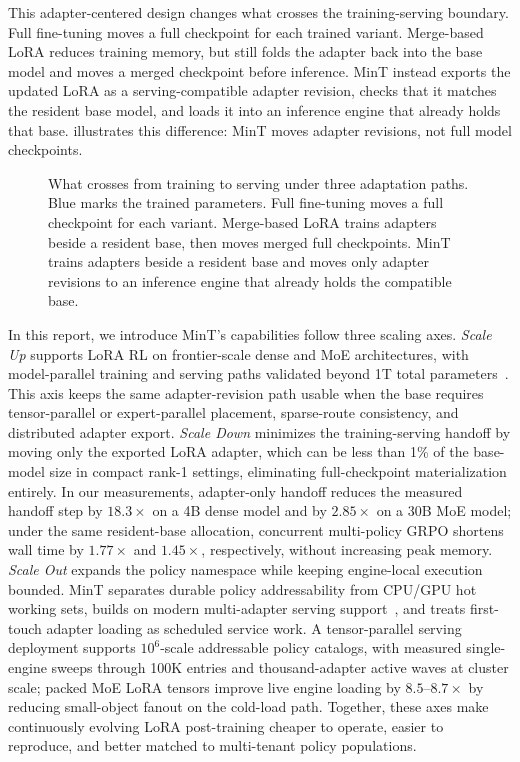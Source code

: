 This adapter-centered design changes what crosses the training-serving boundary. Full fine-tuning moves a full checkpoint for each trained variant. Merge-based LoRA reduces training memory, but still folds the adapter back into the base model and moves a merged checkpoint before inference. MinT instead exports the updated LoRA as a serving-compatible adapter revision, checks that it matches the resident base model, and loads it into an inference engine that already holds that base.  illustrates this difference: MinT moves adapter revisions, not full model checkpoints.

\begin{figure}[H]
    \centering
    \resizebox{\textwidth}{!}{}
    \caption{What crosses from training to serving under three adaptation paths. Blue marks the trained parameters. Full fine-tuning moves a full checkpoint for each variant. Merge-based LoRA trains adapters beside a resident base, then moves merged full checkpoints. MinT trains adapters beside a resident base and moves only adapter revisions to an inference engine that already holds the compatible base.}
    \label{fig:mint_handoff_paths}
\end{figure}

In this report, we introduce MinT's capabilities follow three scaling axes. \textit{Scale Up} supports LoRA RL on frontier-scale dense and MoE architectures, with model-parallel training and serving paths validated beyond 1T total parameters~\citep{qwen3_2025,deepseekv4_2026,glm5_2026,kimi_k2_2025}. This axis keeps the same adapter-revision path usable when the base requires tensor-parallel or expert-parallel placement, sparse-route consistency, and distributed adapter export. \textit{Scale Down} minimizes the training-serving handoff by moving only the exported LoRA adapter, which can be less than 1\% of the base-model size in compact rank-1 settings, eliminating full-checkpoint materialization entirely. In our measurements, adapter-only handoff reduces the measured handoff step by $18.3\times$ on a 4B dense model and by $2.85\times$ on a 30B MoE model; under the same resident-base allocation, concurrent multi-policy GRPO shortens wall time by $1.77\times$ and $1.45\times$, respectively, without increasing peak memory. \textit{Scale Out} expands the policy namespace while keeping engine-local execution bounded. MinT separates durable policy addressability from CPU/GPU hot working sets, builds on modern multi-adapter serving support~\citep{vllm2023,punica2024,slora2023,dlora2024,loraserve2025}, and treats first-touch adapter loading as scheduled service work. A tensor-parallel serving deployment supports $10^6$-scale addressable policy catalogs, with measured single-engine sweeps through 100K entries and thousand-adapter active waves at cluster scale; packed MoE LoRA tensors improve live engine loading by $8.5$--$8.7\times$ by reducing small-object fanout on the cold-load path. Together, these axes make continuously evolving LoRA post-training cheaper to operate, easier to reproduce, and better matched to multi-tenant policy populations.

